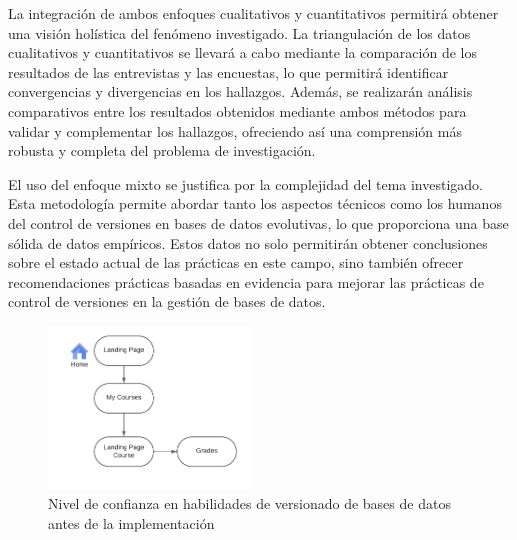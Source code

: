 \documentclass{IEEEtran}
\begin{document}
La integración de ambos enfoques cualitativos y cuantitativos permitirá obtener una visión holística del fenómeno investigado. La triangulación de los datos cualitativos y cuantitativos se llevará a cabo mediante la comparación de los resultados de las entrevistas y las encuestas, lo que permitirá identificar convergencias y divergencias en los hallazgos. Además, se realizarán análisis comparativos entre los resultados obtenidos mediante ambos métodos para validar y complementar los hallazgos, ofreciendo así una comprensión más robusta y completa del problema de investigación.

El uso del enfoque mixto se justifica por la complejidad del tema investigado. Esta metodología permite abordar tanto los aspectos técnicos como los humanos del control de versiones en bases de datos evolutivas, lo que proporciona una base sólida de datos empíricos. Estos datos no solo permitirán obtener conclusiones sobre el estado actual de las prácticas en este campo, sino también ofrecer recomendaciones prácticas basadas en evidencia para mejorar las prácticas de control de versiones en la gestión de bases de datos.



\begin{figure}[H]
    \centering
    \includegraphics[width=0.48\textwidth]{images/figure1.png}
    \caption{Nivel de confianza en habilidades de versionado de bases de datos antes de la implementación}
    \label{fig:figure1}
\end{figure}
\end{document}
